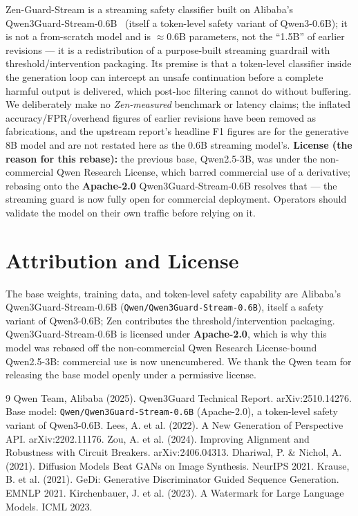 \documentclass[11pt,a4paper]{article}
\begin{document}
Zen-Guard-Stream is a streaming safety classifier built on Alibaba's Qwen3Guard-Stream-0.6B~\cite{qwen3guard} (itself a token-level safety variant of Qwen3-0.6B); it is not a from-scratch model and is $\approx$0.6B parameters, not the ``1.5B'' of earlier revisions --- it is a redistribution of a purpose-built streaming guardrail with threshold/intervention packaging. Its premise is that a token-level classifier inside the generation loop can intercept an unsafe continuation before a complete harmful output is delivered, which post-hoc filtering cannot do without buffering. We deliberately make no \emph{Zen-measured} benchmark or latency claims; the inflated accuracy/FPR/overhead figures of earlier revisions have been removed as fabrications, and the upstream report's headline F1 figures are for the generative 8B model and are not restated here as the 0.6B streaming model's. \textbf{License (the reason for this rebase):} the previous base, Qwen2.5-3B, was under the non-commercial Qwen Research License, which barred commercial use of a derivative; rebasing onto the \textbf{Apache-2.0} Qwen3Guard-Stream-0.6B resolves that --- the streaming guard is now fully open for commercial deployment. Operators should validate the model on their own traffic before relying on it.

\section*{Attribution and License}

The base weights, training data, and token-level safety capability are Alibaba's Qwen3Guard-Stream-0.6B (\texttt{Qwen/Qwen3Guard-Stream-0.6B}), itself a safety variant of Qwen3-0.6B; Zen contributes the threshold/intervention packaging. Qwen3Guard-Stream-0.6B is licensed under \textbf{Apache-2.0}, which is why this model was rebased off the non-commercial Qwen Research License-bound Qwen2.5-3B: commercial use is now unencumbered. We thank the Qwen team for releasing the base model openly under a permissive license.

\begin{thebibliography}{9}
 Qwen Team, Alibaba (2025). Qwen3Guard Technical Report. arXiv:2510.14276. Base model: \texttt{Qwen/Qwen3Guard-Stream-0.6B} (Apache-2.0), a token-level safety variant of Qwen3-0.6B.
 Lees, A. et al. (2022). A New Generation of Perspective API. arXiv:2202.11176.
 Zou, A. et al. (2024). Improving Alignment and Robustness with Circuit Breakers. arXiv:2406.04313.
 Dhariwal, P. \& Nichol, A. (2021). Diffusion Models Beat GANs on Image Synthesis. NeurIPS 2021.
 Krause, B. et al. (2021). GeDi: Generative Discriminator Guided Sequence Generation. EMNLP 2021.
 Kirchenbauer, J. et al. (2023). A Watermark for Large Language Models. ICML 2023.
\end{thebibliography}
\end{document}
